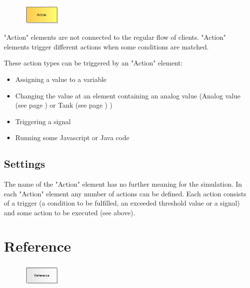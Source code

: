 \begin{figure}
\vspace{-22pt}
\includegraphics[width=2cm]{imageModelElementAction.png}
\vspace{-22pt}
\end{figure}

"Action" elements are not connected to the regular flow of clients.
"Action" elements trigger different actions when some conditions are matched.

These action types can be triggered by an "Action" element:

\begin{itemize}
  \item Assigning a value to a variable 
  \item Changing the value at an element containing an analog value
  (Analog value (see page \pageref{ref:ModelElementAnalogValue}) or Tank (see page \pageref{ref:ModelElementTank}) )
  \item Triggering a signal 
  \item Running some Javascript or Java code 
\end{itemize}

\subsection*{Settings}

The name of the "Action" element has no further meaning for the simulation.
In each "Action" element any number of actions can be defined. Each action
consists of a trigger (a condition to be fulfilled, an exceeded threshold value or a signal)
and some action to be executed (see above).


\section{Reference}
\label{ref:ModelElementReference}

\begin{figure}
\vspace{-22pt}
\includegraphics[width=2cm]{imageModelElementReference.png}
\vspace{-22pt}
\end{figure}

